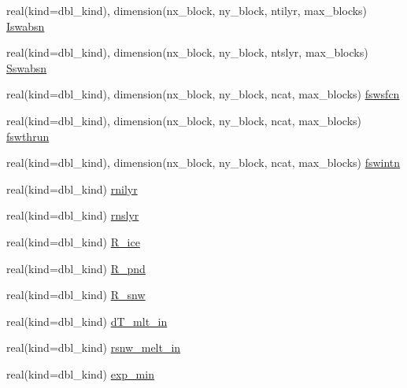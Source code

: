 \begin{DoxyCompactItemize}
\item 
real(kind=dbl\_\-kind), dimension(nx\_\-block, ny\_\-block, ntilyr, max\_\-blocks) \hyperlink{namespaceice__shortwave_ab47843d78d636ebc26ad1cbccdd855e0}{Iswabsn}
\item 
real(kind=dbl\_\-kind), dimension(nx\_\-block, ny\_\-block, ntslyr, max\_\-blocks) \hyperlink{namespaceice__shortwave_a174658715b844908a4691581fd3b83c9}{Sswabsn}
\item 
real(kind=dbl\_\-kind), dimension(nx\_\-block, ny\_\-block, ncat, max\_\-blocks) \hyperlink{namespaceice__shortwave_a2b2e5ef90cc9c908da7af342c0988e59}{fswsfcn}
\item 
real(kind=dbl\_\-kind), dimension(nx\_\-block, ny\_\-block, ncat, max\_\-blocks) \hyperlink{namespaceice__shortwave_a074d77add6f79e715c81aa6b4600bf98}{fswthrun}
\item 
real(kind=dbl\_\-kind), dimension(nx\_\-block, ny\_\-block, ncat, max\_\-blocks) \hyperlink{namespaceice__shortwave_aeb385ab42b4e03ee1b8cde25541c1e64}{fswintn}
\item 
real(kind=dbl\_\-kind) \hyperlink{namespaceice__shortwave_aadfde47ad01a2e1dae6a025ccd26c203}{rnilyr}
\item 
real(kind=dbl\_\-kind) \hyperlink{namespaceice__shortwave_ad12f4239092092b69b1b300e947a1164}{rnslyr}
\item 
real(kind=dbl\_\-kind) \hyperlink{namespaceice__shortwave_a24f28156b34d4f65677538c86071d9ae}{R\_\-ice}
\item 
real(kind=dbl\_\-kind) \hyperlink{namespaceice__shortwave_aff78b63ae903ff25c0dac10823ea0c9b}{R\_\-pnd}
\item 
real(kind=dbl\_\-kind) \hyperlink{namespaceice__shortwave_aa81b977d29eec195afdf7d4a8eed13df}{R\_\-snw}
\item 
real(kind=dbl\_\-kind) \hyperlink{namespaceice__shortwave_a893d8a9d70334a9f7b5743e91d37cf92}{dT\_\-mlt\_\-in}
\item 
real(kind=dbl\_\-kind) \hyperlink{namespaceice__shortwave_ab259ebc59a0a09d26c7242306435b662}{rsnw\_\-melt\_\-in}
\item 
real(kind=dbl\_\-kind) \hyperlink{namespaceice__shortwave_a55ffdfb6fb5de60880330a142dfb398f}{exp\_\-min}
\end{DoxyCompactItemize}


